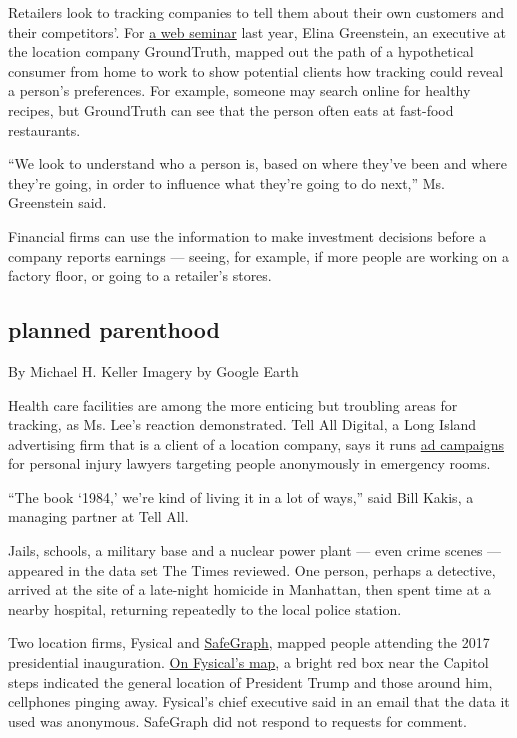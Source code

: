 Retailers look to tracking companies to tell them about their own
customers and their competitors'. For
\href{https://www.youtube.com/watch?v=BVZc86CZovU}{a web seminar} last
year, Elina Greenstein, an executive at the location company
GroundTruth, mapped out the path of a hypothetical consumer from home to
work to show potential clients how tracking could reveal a person's
preferences. For example, someone may search online for healthy recipes,
but GroundTruth can see that the person often eats at fast-food
restaurants.

``We look to understand who a person is, based on where they've been and
where they're going, in order to influence what they're going to do
next,'' Ms. Greenstein said.

Financial firms can use the information to make investment decisions
before a company reports earnings --- seeing, for example, if more
people are working on a factory floor, or going to a retailer's stores.

\hypertarget{planned-parenthood}{%
\subsection{planned parenthood}\label{planned-parenthood}}

By Michael H. Keller \textbar{} Imagery by Google Earth

Health care facilities are among the more enticing but troubling areas
for tracking, as Ms. Lee's reaction demonstrated. Tell All Digital, a
Long Island advertising firm that is a client of a location company,
says it runs
\href{https://www.npr.org/sections/health-shots/2018/05/25/613127311/digital-ambulance-chasers-law-firms-send-ads-to-patients-phones-inside-ers}{ad
campaigns} for personal injury lawyers targeting people anonymously in
emergency rooms.

``The book `1984,' we're kind of living it in a lot of ways,'' said Bill
Kakis, a managing partner at Tell All.

Jails, schools, a military base and a nuclear power plant --- even crime
scenes --- appeared in the data set The Times reviewed. One person,
perhaps a detective, arrived at the site of a late-night homicide in
Manhattan, then spent time at a nearby hospital, returning repeatedly to
the local police station.

Two location firms, Fysical and
\href{https://blog.safegraph.com/inauguration-attendees-make-significantly-less-money-than-womens-march-attendees-7cb8b056556a}{SafeGraph},
mapped people attending the 2017 presidential inauguration.
\href{https://medium.com/fysicalblog/the-2017-womens-march-in-washington-had-3x-the-attendance-as-trump-s-inauguration-267fc7f6968c}{On
Fysical's map}, a bright red box near the Capitol steps indicated the
general location of President Trump and those around him, cellphones
pinging away. Fysical's chief executive said in an email that the data
it used was anonymous. SafeGraph did not respond to requests for
comment.

